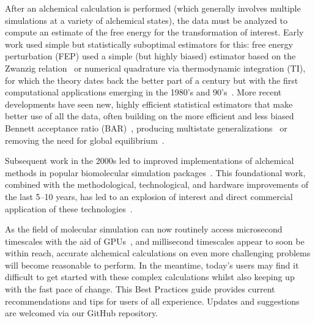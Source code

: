 \documentclass[9pt,bestpractices]{livecoms}
\begin{document}
After an alchemical calculation is performed (which generally involves multiple simulations at a variety of alchemical states), the data must be analyzed to compute an estimate of the free energy for the transformation of interest.
 Early work used simple but statistically suboptimal estimators for this: free energy perturbation (FEP) used a simple (but highly biased) estimator based on the Zwanzig relation~\cite{zwanzig1954hightemperature} or numerical quadrature via thermodynamic integration (TI), for which the theory dates back the better part of a century but with the first computational applications emerging in the 1980's and 90's~\cite{kirkwood1935statistical, jorgensen1985monte, kollman1993free, wong1986dynamicsa, merz1989free}. %
 More recent developments have seen new, highly efficient statistical estimators that make better use of all the data, often building on the more efficient and less biased Bennett acceptance ratio (BAR)~\cite{bennett1976efficient}, producing multistate generalizations~\cite{shirts2008statisticallya} or removing the need for global equilibrium~\cite{wu2016multiensemble, mey2014xtram, wu2014statistically}.

Subsequent work in the 2000s led to improved implementations of alchemical methods in popular biomolecular simulation packages~\cite{shirts2003extremely,shirts2005solvation,vanderspoel2005gromacs, mermelstein2018fast, wang2015accurate, hedges2019biosimspace}. 
 This foundational work, combined with the methodological, technological, and hardware improvements of the last 5--10 years, has led to an explosion of interest and direct commercial application of these technologies~\cite{wang2015accurate, fratev2019improved, schindler2020largescale, cournia2017relative, sherborne2016collaborating, kuhn2020assessment}.


As the field of molecular simulation can now routinely access microsecond timescales with the aid of GPUs~\cite{salomon-ferrer2013routine}, and millisecond timescales appear to soon be within reach, accurate alchemical calculations on even more challenging problems will become reasonable to perform. 
In the meantime, today's users may find it difficult to get started with these complex calculations whilst also keeping up with the fast pace of change. 
This Best Practices guide provides current recommendations and tips for users of all experience. Updates and suggestions are welcomed via our GitHub repository.    
\end{document}

